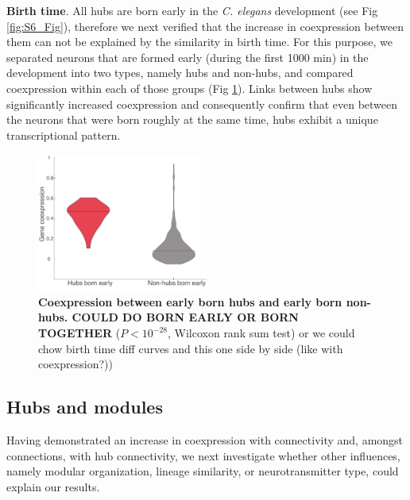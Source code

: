 \documentclass[10pt,letterpaper]{article}
\begin{document}
\textbf{Birth time}. 
All hubs are born early in the \textit{C. elegans} development \cite{Varier2011} (see Fig \ref{fig:S6_Fig}), therefore we next verified that the increase in coexpression between them can not be explained by the similarity in birth time. 
For this purpose, we separated neurons that are formed early (during the first 1000 min) in the development into two types, namely hubs and non-hubs, and compared coexpression within each of those groups (Fig \ref{fig:BirthTimeHubs}). 
Links between hubs show significantly increased coexpression and consequently confirm that even between the neurons that were born roughly at the same time, hubs exhibit a unique transcriptional pattern.
\begin{figure}[t]
  \centering
    \includegraphics[width=0.5\textwidth]{BirthTimeHubs.pdf}
 \caption{\textbf{Coexpression between early born hubs and early born non-hubs. COULD DO BORN EARLY OR BORN TOGETHER} ($P < 10^{-28}$, Wilcoxon rank sum test) or we could chow birth time diff curves and this one side by side (like with coexpression?))
}
\label{fig:BirthTimeHubs}
\end{figure}


\subsection*{Hubs and modules}
Having demonstrated an increase in coexpression with connectivity and, amongst connections, with hub connectivity, we next investigate whether other influences, namely modular organization, lineage similarity, or neurotransmitter type, could explain our results.

\end{document}
